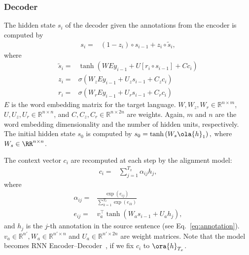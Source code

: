 \subsubsection{Decoder}

The hidden state $s_i$ of the decoder given the annotations from the encoder is
computed by
\begin{align*}
    s_i =& (1 - z_i) \circ s_{i-1} + z_i \circ \tilde{s}_i,
\end{align*}
where
\begin{align*}
    \tilde{s}_{i} =& \tanh \left( W E y_{i - 1} + U \left[ r_i \circ s_{i - 1} \right] +
    C c_i \right) \\ 
    z_i =& \sigma\left( W_z E y_{i - 1} + U_z s_{i-1} 
    + C_z c_i \right)\\
    r_i =& \sigma\left( W_r E y_{i - 1} + U_r s_{i-1}
    + C_r c_i \right)
\end{align*}
$E$ is the word embedding matrix for the target language.
$W, W_z, W_r \in \mathbb{R}^{n\times m}$, 
$U, U_z, U_r \in \mathbb{R}^{n\times n}$, and
$C, C_z, C_r \in \mathbb{R}^{n\times 2n}$ are weights. Again, $m$ and $n$ are the word
embedding dimensionality and the number of hidden units, respectively.
The initial hidden state $s_0$ is computed by 
$
    s_{0} = \tanh\left( W_s \ola{h}_1 \right),
$
where $W_s \in \RR^{n \times n}$.

The context vector $c_i$ are recomputed at each step by the alignment model:
\begin{align*}
    c_i =& \sum_{j=1}^{T_x} \alpha_{ij} h_j,
\end{align*}
where
\begin{align*}
    \alpha_{ij} =& \frac{\exp\left(e_{ij}\right)}{\sum_{k=1}^{T_x}
    \exp\left(e_{ik}\right)}  \\
    e_{ij} =& v_a^{\top} \tanh\left( W_a s_{i-1} + U_a h_j \right),
\end{align*}
and $h_j$ is the $j$-th annotation in the source sentence (see
Eq.~\eqref{eq:annotation}).  $v_a \in \mathbb{R}^{n'}, W_a \in
\mathbb{R}^{n'\times n}$ and $U_a \in \mathbb{R}^{n'\times  2n}$ are weight
matrices.  Note that the model becomes
RNN Encoder--Decoder~\citep{Cho2014}, if we fix $c_i$ to $\ora{h}_{T_x}$.

